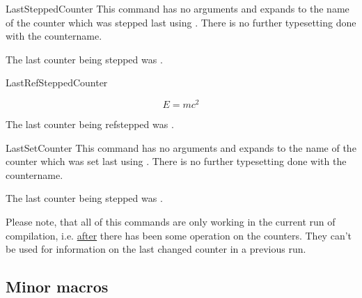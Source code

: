 \documentclass[12pt,paper=a4]{article}
\begin{document}
\begin{docCommand}{LastSteppedCounter}{}
This command has no arguments and expands to the name of the counter which was stepped last using . There is no further typesetting done with the countername. 

\begin{dispExample}

  The last counter being stepped  was \PrettyPrintCounterName{\LastSteppedCounter}.
\end{dispExample}%

\end{docCommand}%

\begin{docCommand}{LastRefSteppedCounter}{}

\begin{dispExample}
  \begin{equation}
    E = mc^2 \label{eq::einstein}
  \end{equation}

  The last counter being refstepped  was \PrettyPrintCounterName{\LastRefSteppedCounter}.
\end{dispExample}%

\end{docCommand}%





\begin{docCommand}{LastSetCounter}{}
This command has no arguments and expands to the name of the counter which was set last using . There is no further typesetting done with the countername. 

\begin{dispExample}
  \setcounter{SomeCounter}{21}%

  The last counter being stepped  was \PrettyPrintCounterName{\LastSetCounter}.
\end{dispExample}%

\end{docCommand}%

Please note, that all of this commands are only working in the current run of compilation, i.e. \underline{after} there has been some operation on the counters. They can't be used for information on the last changed counter in a previous run. 

\subsection{Minor macros}
\end{document}
